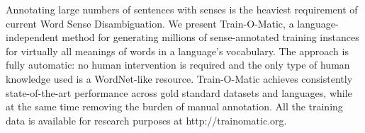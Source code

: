 Annotating large numbers of sentences with senses is the heaviest requirement of current Word Sense Disambiguation. We present Train-O-Matic, a language-independent method for generating millions of sense-annotated training instances for virtually all meanings of words in a language's vocabulary. The approach is fully automatic: no human intervention is required and the only type of human knowledge used is a WordNet-like resource. Train-O-Matic achieves consistently state-of-the-art performance across gold standard datasets and languages, while at the same time removing the burden of manual annotation. All the training data is available for research purposes at http://trainomatic.org.
